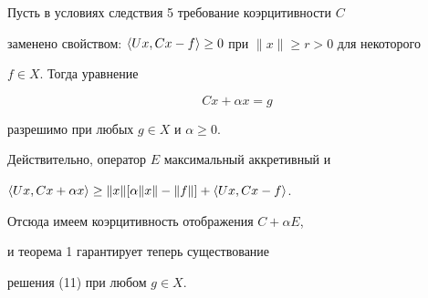  


\begin{cor} Пусть в условиях следствия 5 требование коэрцитивности $C$ 


заменено свойством: $\langle Ux,Cx-f\rangle\ge 0$ при $\|x\|\ge r>0$ для некоторого 


$f\in X$. Тогда уравнение 


\begin{equation} 


Cx+\alpha x=g 


\end{equation} 


разрешимо при любых $g\in X$ и $\alpha\ge 0$. 


\end{cor} 


 


Действительно, оператор $E$ максимальный аккретивный и 


$\langle Ux, Cx+\alpha x\rangle\ge\|x\|[\alpha\|x\|-\|f\|]+\langle Ux,Cx-f\rangle$. 


Отсюда имеем коэрцитивность отображения $C+\alpha E$, 


и теорема 1 гарантирует теперь существование 


решения (11) при любом $g\in X$. 


 


